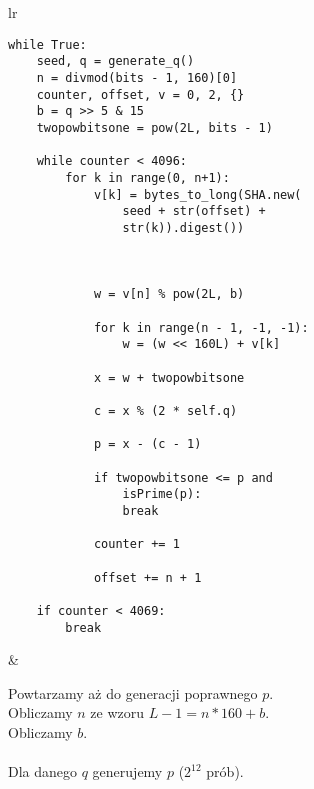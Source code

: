 \documentclass{article}
\begin{document}
        \noindent\begin{table}[ht!]
            \begin{tabular}{lr}
                \begin{minipage}[t]{0.45\textwidth}
                    \begin{verbatim}
while True:
    seed, q = generate_q()
    n = divmod(bits - 1, 160)[0]
    counter, offset, v = 0, 2, {}
    b = q >> 5 & 15
    twopowbitsone = pow(2L, bits - 1)

    while counter < 4096:
        for k in range(0, n+1):
            v[k] = bytes_to_long(SHA.new(
                seed + str(offset) + 
                str(k)).digest())



            w = v[n] % pow(2L, b)

            for k in range(n - 1, -1, -1):
                w = (w << 160L) + v[k]

            x = w + twopowbitsone
            
            c = x % (2 * self.q)
            
            p = x - (c - 1)

            if twopowbitsone <= p and 
                isPrime(p):
                break

            counter += 1
            
            offset += n + 1

    if counter < 4069:
        break
                    \end{verbatim}
                \end{minipage}
                
                &
        
                \begin{minipage}[t]{0.45\textwidth}
                    \noindent Powtarzamy aż do generacji poprawnego $p$. \\
                    
                    \noindent Obliczamy $n$ ze wzoru $L - 1 = n * 160 + b$. \\
                    
                    \noindent Obliczamy $b$. \\ \\
                                        
                    \noindent Dla danego $q$ generujemy $p$ ($2^{12}$ prób). \\
                    

\end{minipage}
\end{tabular}
\end{table}
\end{document}
